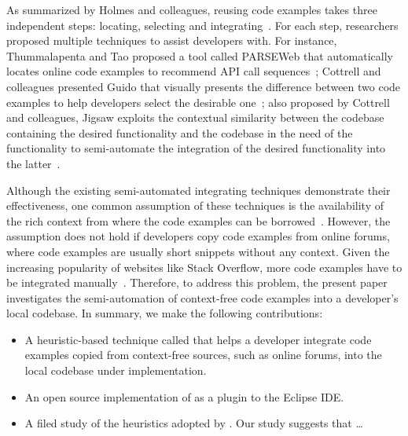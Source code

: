As summarized by Holmes and colleagues, reusing code examples takes three
independent steps: locating, selecting and integrating~\cite{Holmes3}. For each
step, researchers proposed multiple techniques to assist developers with. For
instance, Thummalapenta and Tao proposed a tool called PARSEWeb that
automatically locates online code examples to recommend API call
sequences~\cite{Thummalapenta}; Cottrell and colleagues presented Guido that
visually presents the difference between two code examples to help developers
select the desirable one~\cite{Cottrell1}; also proposed by Cottrell and
colleagues, Jigsaw exploits the contextual similarity between the codebase
containing the desired functionality and the codebase in the need of the
functionality to semi-automate the integration of the desired functionality into
the latter~\cite{Cottrell2}.

Although the existing semi-automated integrating techniques demonstrate their
effectiveness, one common assumption of these techniques is the availability of
the rich context from where the code examples can be borrowed~\cite{Cottrell2}.
However, the assumption does not hold if developers copy code examples from
online forums, where code examples are usually short snippets without any
context. Given the increasing popularity of websites like Stack Overflow, more
code examples have to be integrated manually~\cite{Treude, Parnin}. Therefore, to
address this problem, the present paper investigates the semi-automation of
context-free code examples into a developer's local codebase. In summary, we
make the following contributions:

\begin{itemize}
\item A heuristic-based technique called \toolname{} that helps a developer
integrate code examples copied from context-free sources, such as online forums,
into the local codebase under implementation.

\item An open source implementation of \toolname{} as a plugin to the Eclipse
IDE.

\item A filed study of the heuristics adopted by \toolname{}. Our study suggests
that \ldots

\end{itemize}


